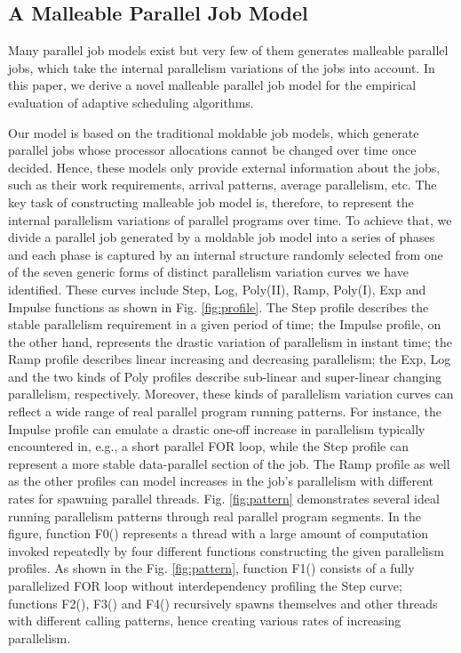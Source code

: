 \documentclass[10pt, a4paper]{article}
\begin{document}
\subsection{A Malleable Parallel Job Model}

Many parallel job models exist but very few of them generates malleable parallel jobs, which take
the internal parallelism variations of the jobs into account. In this paper, we derive a novel
malleable parallel job model for the empirical evaluation of adaptive scheduling algorithms.

Our model is based on the traditional moldable job models, which generate parallel jobs whose
processor allocations cannot be changed over time once decided. Hence, these models only provide
external information about the jobs, such as their work requirements, arrival patterns, average
parallelism, etc. The key task of constructing malleable job model is, therefore, to represent the
internal parallelism variations of parallel programs over time. To achieve that, we divide a
parallel job generated by a moldable job model into a series of phases and each phase is captured
by an internal structure randomly selected from one of the seven generic forms of distinct
parallelism variation curves we have identified. These curves include Step, Log, Poly(II), Ramp,
Poly(I), Exp and Impulse functions as shown in Fig. \ref{fig:profile}. The Step profile describes
the stable parallelism requirement in a given period of time; the Impulse profile, on the other
hand, represents the drastic variation of parallelism in instant time; the Ramp profile describes
linear increasing and decreasing parallelism; the Exp, Log and the two kinds of Poly profiles
describe sub-linear and super-linear changing parallelism, respectively. Moreover, these kinds of
parallelism variation curves can reflect a wide range of real parallel program running patterns.
For instance, the Impulse profile can emulate a drastic one-off increase in parallelism typically
encountered in, e.g., a short parallel FOR loop, while the Step profile can represent a more stable
data-parallel section of the job. The Ramp profile as well as the other profiles can model
increases in the job's parallelism with different rates for spawning parallel threads. Fig.
\ref{fig:pattern} demonstrates several ideal running parallelism patterns through real parallel
program segments. In the figure, function F0() represents a thread with a large amount of
computation invoked repeatedly by four different functions constructing the given parallelism
profiles. As shown in the Fig. \ref{fig:pattern}, function F1() consists of a fully parallelized
FOR loop without interdependency profiling the Step curve; functions F2(), F3() and F4()
recursively spawns themselves and other threads with different calling patterns, hence creating
various rates of increasing parallelism.
\end{document}

